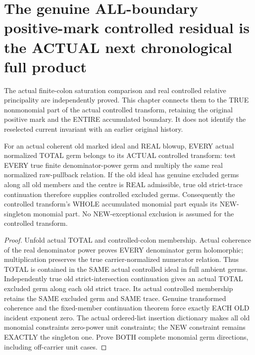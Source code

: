 \section{The genuine ALL-boundary positive-mark controlled residual is the ACTUAL next chronological full product}

The actual finite-colon saturation comparison and real controlled relative
principality are independently proved. This chapter connects them to the
TRUE nonmonomial part of the actual controlled transform, retaining the
original positive mark and the ENTIRE accumulated boundary. It does not
identify the reselected current invariant with an earlier original history.

\begin{lemma}
\label{hir:sharp-actual-total-controlled-old-trace-exclusion-monomial-dictionary}
\leanok
For an actual coherent old marked ideal and REAL blowup, EVERY actual
normalized TOTAL germ belongs to its ACTUAL controlled transform: test
EVERY true finite denominator-power germ and multiply the same real
normalized raw-pullback relation. If the old ideal has genuine excluded
germs along all old members and the centre is REAL admissible, true old
strict-trace continuation therefore supplies controlled excluded germs.
Consequently the controlled transform's WHOLE accumulated monomial part
equals its NEW-singleton monomial part. No NEW-exceptional exclusion is
assumed for the controlled transform.
\end{lemma}
\begin{proof}
Unfold actual TOTAL and controlled-colon membership. Actual coherence of
the real denominator power proves EVERY denominator germ holomorphic;
multiplication preserves the true carrier-normalized numerator relation.
Thus TOTAL is contained in the SAME actual controlled ideal in full ambient
germs. Independently true old strict-intersection continuation gives an
actual TOTAL excluded germ along each old strict trace. Its actual
controlled membership retains the SAME excluded germ and SAME trace.
Genuine transformed coherence and the fixed-member continuation theorem
force exactly EACH OLD incident exponent zero. The actual ordered-list
insertion dictionary makes all old monomial constraints zero-power unit
constraints; the NEW constraint remains EXACTLY the singleton one. Prove
BOTH complete monomial germ directions, including off-carrier unit cases.
\end{proof}

